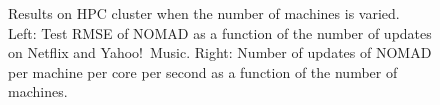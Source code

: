 \documentclass{vldb}
\begin{document}
\begin{figure}[tbp]
  \caption{Results on HPC cluster when the number of machines is
    varied. Left: Test RMSE of NOMAD as a function of the number of
    updates on Netflix and Yahoo!~Music. Right: Number of updates of
    NOMAD per machine per core per second as a function of the number of
    machines.}
  \label{fig:multi_collection}
\end{figure}
\end{document}
